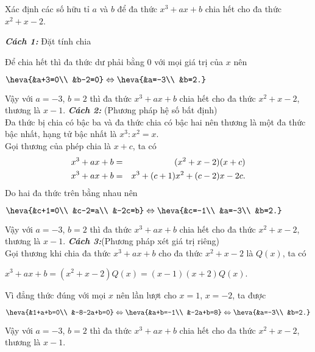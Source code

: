 \begin{vd}%
	Xác định các số hữu tỉ $a$ và $b$ để đa thức $x^3+ax+b$ chia hết cho đa thức $x^2+x-2$.
	\loigiai
	{
		\textbf{\textit{Cách 1:}}
		Đặt tính chia\\
		\begin{center}
		\end{center}
		Để chia hết thì đa thức dư phải bằng $0$ với mọi giá trị của $x$ nên
		\begin{center}
			$\heva{&a+3=0\\ &b-2=0}\Leftrightarrow \heva{&a=-3\\ &b=2.}$
		\end{center}
		Vậy với $a=-3$, $b=2$ thì đa thức $x^3+ax+b$ chia hết cho đa thức $x^2+x-2$, thương là $x-1$.
		\textbf{\textit{Cách 2:}} (Phương pháp hệ số bất định)\\
		Đa thức bị chia có bậc ba và đa thức chia có bậc hai nên thương là một đa thức bậc nhất, hạng tử bậc nhất là $x^3:x^2=x$.\\
		Gọi thương của phép chia là $x+c$, ta có
		{\allowdisplaybreaks
			\begin{eqnarray*}
				x^3+ax+b&= &(x^2+x-2)(x+c)\notag\\
				x^3+ax+b&= &x^3+(c+1)x^2+(c-2)x-2c.\notag
			\end{eqnarray*}}
		Do hai đa thức trên bằng nhau nên
		\begin{center}
			$\heva{&c+1=0\\ &c-2=a\\ &-2c=b}\Leftrightarrow \heva{&c=-1\\ &a=-3\\ &b=2.}$
		\end{center}
		Vậy với $a=-3$, $b=2$ thì đa thức $x^3+ax+b$ chia hết cho đa thức $x^2+x-2$, thương là $x-1$.
		\textbf{\textit{Cách 3:}}(Phương pháp xét giá trị riêng)\\
		Gọi thương khi chia đa thức $x^3+ax+b$ cho đa thức $x^2+x-2$ là $Q(x)$, ta có
		\begin{center}
			$x^3+ax+b=(x^2+x-2)Q(x)=(x-1)(x+2)Q(x).$
		\end{center}
		Vì đẳng thức đúng với mọi $x$ nên lần lượt cho $x=1$, $x=-2$, ta được
		\begin{center}
			$\heva{&1+a+b=0\\ &-8-2a+b=0}\Leftrightarrow \heva{&a+b=-1\\ &-2a+b=8}\Leftrightarrow \heva{&a=-3\\ &b=2.}$
		\end{center}
		Vậy với $a=-3$, $b=2$ thì đa thức $x^3+ax+b$ chia hết cho đa thức $x^2+x-2$, thương là $x-1$.
	}
\end{vd}

